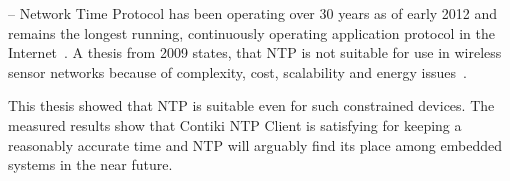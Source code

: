 


--
Network Time Protocol has been operating over 30 years as of early 2012
and remains the longest running, continuously operating application
protocol in the Internet~\cite{ntp-y2k}.
A thesis from 2009 states, that NTP is
not suitable for use in wireless sensor networks because of complexity, cost,
scalability and energy issues~\cite{thesis-sync}.

This thesis showed that NTP is suitable even for such constrained devices.
The measured results show that Contiki NTP Client is satisfying for keeping a reasonably accurate time
and NTP will arguably find its place among embedded systems in the near future.
